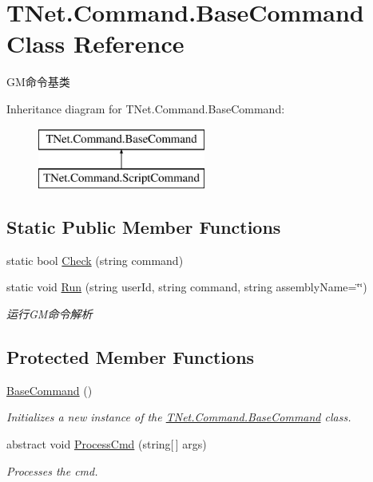 \hypertarget{class_t_net_1_1_command_1_1_base_command}{}\section{T\+Net.\+Command.\+Base\+Command Class Reference}
\label{class_t_net_1_1_command_1_1_base_command}


G\+M命令基类  


Inheritance diagram for T\+Net.\+Command.\+Base\+Command\+:\begin{figure}[H]
\begin{center}
\leavevmode
\includegraphics[height=2.000000cm]{class_t_net_1_1_command_1_1_base_command}
\end{center}
\end{figure}
\subsection*{Static Public Member Functions}
\begin{DoxyCompactItemize}
\item 
static bool \mbox{\hyperlink{class_t_net_1_1_command_1_1_base_command_a9b6c6ebf3f49efbf7b12321b954fbe19}{Check}} (string command)
\item 
static void \mbox{\hyperlink{class_t_net_1_1_command_1_1_base_command_a4037d7f82a3f915f944c2b2ee3ce267c}{Run}} (string user\+Id, string command, string assembly\+Name=\char`\"{}\char`\"{})
\begin{DoxyCompactList}\small\item\em 运行\+G\+M命令解析 \end{DoxyCompactList}\end{DoxyCompactItemize}
\subsection*{Protected Member Functions}
\begin{DoxyCompactItemize}
\item 
\mbox{\hyperlink{class_t_net_1_1_command_1_1_base_command_add73971418b21606e67278ebbc265210}{Base\+Command}} ()
\begin{DoxyCompactList}\small\item\em Initializes a new instance of the \mbox{\hyperlink{class_t_net_1_1_command_1_1_base_command}{T\+Net.\+Command.\+Base\+Command}} class. \end{DoxyCompactList}\item 
abstract void \mbox{\hyperlink{class_t_net_1_1_command_1_1_base_command_a7074bfedc9614ab46da40606cfefa4e0}{Process\+Cmd}} (string\mbox{[}$\,$\mbox{]} args)
\begin{DoxyCompactList}\small\item\em Processes the cmd. \end{DoxyCompactList}\end{DoxyCompactItemize}
